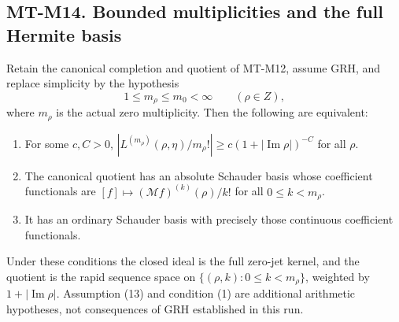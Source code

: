 \subsection*{MT-M14. Bounded multiplicities and the full Hermite basis}
Retain the canonical completion and quotient of MT-M12, assume
GRH, and replace simplicity by the hypothesis
\[
                  1\le m_\rho\le m_0<\infty
                              \qquad(\rho\in Z),       \tag{13}
\]
where $m_\rho$ is the actual zero multiplicity.
Then the following are equivalent:
\begin{enumerate}
\item For some $c,C>0$,
$|L^{(m_\rho)}(\rho,\eta)/m_\rho!|
       \ge c(1+|\operatorname{Im}\rho|)^{-C}$ for all $\rho$.
\item The canonical quotient has an absolute Schauder basis
whose coefficient functionals are
$[f]\mapsto(\mathcal Mf)^{(k)}(\rho)/k!$ for all
$0\le k<m_\rho$.
\item It has an ordinary Schauder basis with precisely those
continuous coefficient functionals.
\end{enumerate}
Under these conditions the closed ideal is the full zero-jet
kernel, and the quotient is the rapid sequence space on
$\{(\rho,k):0\le k<m_\rho\}$, weighted by
$1+|\operatorname{Im}\rho|$. Assumption (13) and condition (1)
are additional arithmetic hypotheses, not consequences of GRH
established in this run.

